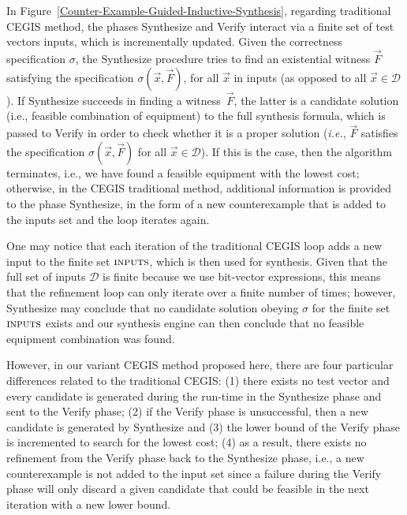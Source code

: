In Figure~\ref{Counter-Example-Guided-Inductive-Synthesis}, regarding traditional CEGIS method, the phases {\sc Synthesize} and {\sc Verify} interact via a finite set of test vectors {\sc inputs}, which is incrementally updated. Given the correctness specification $\sigma$, the {\sc Synthesize} procedure tries to find an existential witness $\vec{F}$ satisfying the specification $\sigma(\vec{x}, \vec{F})$, for all $\vec{x}$ in {\sc inputs} (as opposed to all $\vec{x} \in \mathcal{D}$). If {\sc Synthesize} succeeds in finding a witness~$\vec{F}$, the latter is a candidate solution (i.e., feasible combination of equipment) to the full synthesis formula, which is passed to {\sc Verify} in order to check whether it is a proper solution ({\it i.e.}, $\vec{F}$ satisfies the specification $\sigma(\vec{x}, \vec{F})$ for all $\vec{x}\in\mathcal{D}$). If this is the case, then the algorithm terminates, i.e., we have found a feasible equipment with the lowest cost; otherwise, in the CEGIS traditional method, additional information is provided to the phase {\sc Synthesize}, in the form of a new counterexample that is added to the {\sc inputs} set and the loop iterates again.

One may notice that each iteration of the traditional CEGIS loop adds a new input to the finite set $\text{\sc inputs}$, which is then used for synthesis.  Given that the full set of inputs $\mathcal{D}$ is finite because we use bit-vector expressions, this means that the refinement loop can only iterate over a finite number of times; however, {\sc Synthesize} may conclude that no candidate solution obeying $\sigma$ for the finite set $\text{\sc inputs}$ exists and our synthesis engine can then conclude that no feasible equipment combination was found.

However, in our variant CEGIS method proposed here, there are four particular differences related to the traditional CEGIS: 
(1) there exists no test vector and every candidate is generated during the run-time in the {\sc Synthesize} phase and sent to the {\sc Verify} phase; 
(2) if the {\sc Verify} phase is unsuccessful, then a new candidate is generated by {\sc Synthesize} and 
(3) the lower bound of the {\sc Verify} phase is incremented to search for the lowest cost; 
(4) as a result, there exists no refinement from the {\sc Verify} phase back to the {\sc Synthesize} phase, i.e., 
a new counterexample is not added to the {\sc input} set since a failure during the {\sc Verify} phase will only discard 
a given candidate that could be feasible in the next iteration with a new lower bound.

